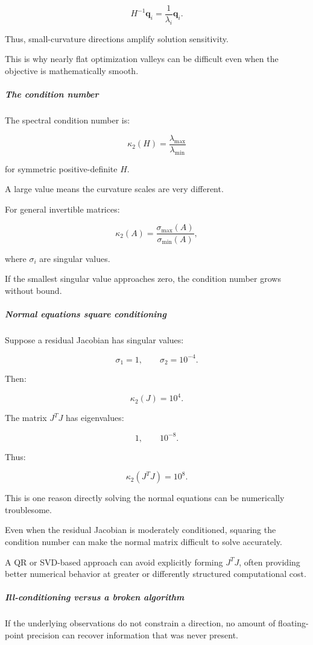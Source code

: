 \[
H^{-1}\mathbf q_i= \frac1{\lambda_i}\mathbf q_i.
\]

Thus, small-curvature directions amplify solution sensitivity.

This is why nearly flat optimization valleys can be difficult even when the objective is mathematically smooth.

\subparagraph{The condition number}\label{the-condition-number}

The spectral condition number is:

\[
\boxed{ \kappa_2(H)= \frac{\lambda_{\max}}{\lambda_{\min}} }
\]

for symmetric positive-definite \(H\).

A large value means the curvature scales are very different.

For general invertible matrices:

\[
\kappa_2(A)= \frac{\sigma_{\max}(A)}{\sigma_{\min}(A)},
\]

where \(\sigma_i\) are singular values.

If the smallest singular value approaches zero, the condition number grows without bound.

\subparagraph{Normal equations square conditioning}\label{normal-equations-square-conditioning}

Suppose a residual Jacobian has singular values:

\[
\sigma_1=1,\qquad\sigma_2=10^{-4}.
\]

Then:

\[
\kappa_2(J)=10^4.
\]

The matrix \(J^TJ\) has eigenvalues:

\[
1,\qquad10^{-8}.
\]

Thus:

\[
\boxed{\kappa_2(J^TJ)=10^8}.
\]

This is one reason directly solving the normal equations can be numerically troublesome.

Even when the residual Jacobian is moderately conditioned, squaring the condition number can make the normal matrix difficult to solve accurately.

A QR or SVD-based approach can avoid explicitly forming \(J^TJ\), often providing better numerical behavior at greater or differently structured computational cost.

\subparagraph{Ill-conditioning versus a broken algorithm}\label{ill-conditioning-versus-a-broken-algorithm}

If the underlying observations do not constrain a direction, no amount of floating-point precision can recover information that was never present.

